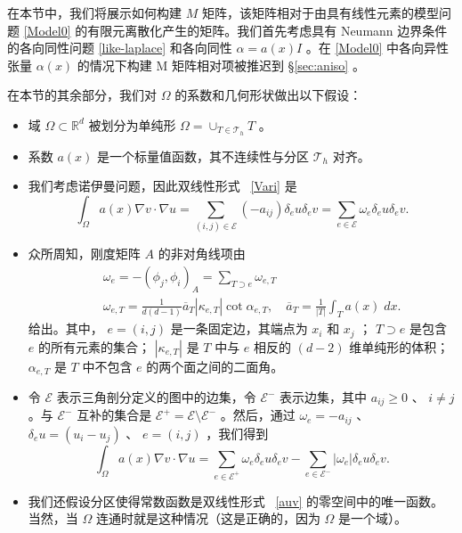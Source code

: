 \documentclass[12pt]{acta_2011xz}
\begin{document}
在本节中，我们将展示如何构建    $M$    矩阵，该矩阵相对于由具有线性元素的模型问题    \eqref{Model0}    的有限元离散化产生的矩阵。我们首先考虑具有 Neumann 边界条件的各向同性问题    \eqref{like-laplace}    和各向同性    $\alpha=a(x) I$    。在    \eqref{Model0}    中各向异性张量    $\alpha(x)$    的情况下构建 M 矩阵相对项被推迟到    \S       \ref{sec:aniso}    。  

在本节的其余部分，我们对    $\Omega$    的系数和几何形状做出以下假设：
   \begin{itemize}

   \item   域    $\Omega\subset \mathbb{R}^d$    被划分为单纯形
   $\Omega=\cup_{T\in\mathcal{T}_h} T$    。   \item   系数    $a(x)$    是一个标量值函数，其不连续性与分区    $\mathcal{T}_h$    对齐。   \item   我们考虑诺伊曼问题，因此双线性形式~    \eqref{Vari}    是
   \begin{equation}\label{auv}
\int_{\Omega}a(x) \nabla v \cdot \nabla u  = 
\sum_{(i,j)\in \mathcal{E}} (-a_{ij})\delta_eu\delta_e v 
=\sum_{e\in \mathcal{E}} \omega_e\delta_eu\delta_e v.
\end{equation}      \item   众所周知，刚度矩阵    $A$    的非对角线项由    \begin{eqnarray*}
&& \omega_e  =  -(\phi_j,\phi_i)_A = \sum_{T\supset e}\omega_{e,T} \\  
&& \omega_{e,T} = \frac{1}{d(d-1)}\overline{a}_T |\kappa_{e,T}|\cot\alpha_{e,T}, \quad
\overline a_T= \frac{1}{|T|}\int_{T} a(x) \; dx.
\end{eqnarray*}    给出。其中，   $e=(i,j)$    是一条固定边，其端点为    $x_i$    和    $x_j$    ；
   $T\supset e$    是包含    $e$    的所有元素的集合；
   $|\kappa_{e,T}|$    是    $T$    中与    $e$    相反的    $(d-2)$    维单纯形的体积；   $\alpha_{e,T}$    是    $T$    中不包含    $e$    的两个面之间的二面角。   \item   令    $\mathcal{E}$    表示三角剖分定义的图中的边集，令    $\mathcal{E}^{-}$    表示边集，其中
   $a_{ij}\ge 0$    、    $i\neq j$    。与    $\mathcal{E}^-$    互补的集合是
   $\mathcal{E}^+=\mathcal{E}\setminus\mathcal{E}^-$    。然后，通过
   $\omega_e = -a_{ij}$    、    $\delta_e u=(u_i-u_j)$    、    $e=(i,j)$    ，我们得到
   \begin{equation}\label{auv-do}
\int_{\Omega}a(x) \nabla v \cdot \nabla u  = 
\sum_{e\in \mathcal{E}^+} \omega_e\delta_eu\delta_ev-\sum_{e\in \mathcal{E}^-} |\omega_e|\delta_eu\delta_ev. 
\end{equation}      \item   我们还假设分区使得常数函数是双线性形式~    \eqref{auv}    的零空间中的唯一函数。当然，当    $\Omega$    连通时就是这种情况（这是正确的，因为    $\Omega$    是一个域）。  \end{itemize}     
\end{document}
